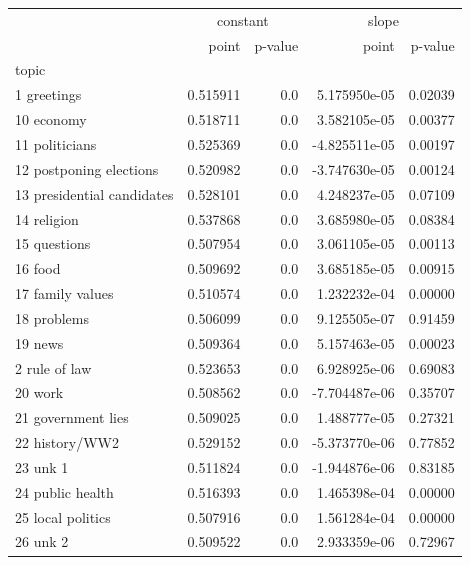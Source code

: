 \documentclass{article}
\begin{document}
\begin{longtable}{lrrrr}
	\toprule
	 & \multicolumn{2}{c}{constant} & \multicolumn{2}{c}{slope} \\
	{} &     point & p-value &         point &  p-value \\
	topic                      &           &         &               &          \\
	\midrule
	1 greetings                &  0.515911 &     0.0 &  5.175950e-05 &  0.02039 \\
	10 economy                 &  0.518711 &     0.0 &  3.582105e-05 &  0.00377 \\
	11 politicians             &  0.525369 &     0.0 & -4.825511e-05 &  0.00197 \\
	12 postponing elections    &  0.520982 &     0.0 & -3.747630e-05 &  0.00124 \\
	13 presidential candidates &  0.528101 &     0.0 &  4.248237e-05 &  0.07109 \\
	14 religion                &  0.537868 &     0.0 &  3.685980e-05 &  0.08384 \\
	15 questions               &  0.507954 &     0.0 &  3.061105e-05 &  0.00113 \\
	16 food                    &  0.509692 &     0.0 &  3.685185e-05 &  0.00915 \\
	17 family values           &  0.510574 &     0.0 &  1.232232e-04 &  0.00000 \\
	18 problems                &  0.506099 &     0.0 &  9.125505e-07 &  0.91459 \\
	19 news                    &  0.509364 &     0.0 &  5.157463e-05 &  0.00023 \\
	2 rule of law              &  0.523653 &     0.0 &  6.928925e-06 &  0.69083 \\
	20 work                    &  0.508562 &     0.0 & -7.704487e-06 &  0.35707 \\
	21 government lies         &  0.509025 &     0.0 &  1.488777e-05 &  0.27321 \\
	22 history/WW2             &  0.529152 &     0.0 & -5.373770e-06 &  0.77852 \\
	23 unk 1                   &  0.511824 &     0.0 & -1.944876e-06 &  0.83185 \\
	24 public health           &  0.516393 &     0.0 &  1.465398e-04 &  0.00000 \\
	25 local politics          &  0.507916 &     0.0 &  1.561284e-04 &  0.00000 \\
	26 unk 2                   &  0.509522 &     0.0 &  2.933359e-06 &  0.72967 \\

\end{longtable}
\end{document}
